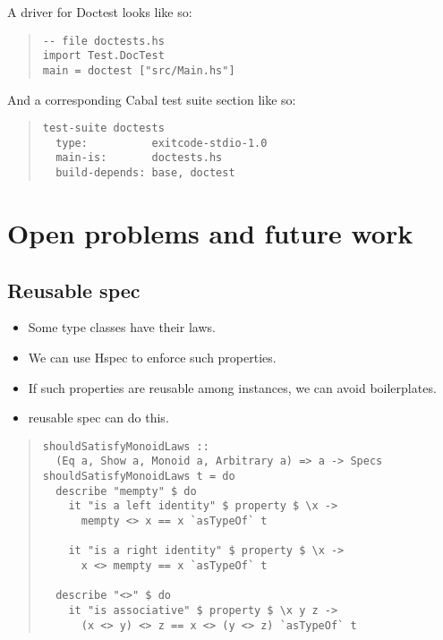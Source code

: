 \documentclass[preprint]{sigplanconf}
\begin{document}
\noindent A driver for Doctest looks like so:

\begin{quote}
\small
\begin{verbatim}
-- file doctests.hs
import Test.DocTest
main = doctest ["src/Main.hs"]
\end{verbatim}
\end{quote}

\noindent And a corresponding Cabal test suite section like so:

\begin{quote}
\small
\begin{verbatim}
test-suite doctests
  type:          exitcode-stdio-1.0
  main-is:       doctests.hs
  build-depends: base, doctest
\end{verbatim}
\end{quote}

\section{Open problems and future work}

\subsection{Reusable spec}

\begin{itemize}
\item Some type classes have their laws.
\item We can use Hspec to enforce such properties.
\item If such properties are reusable among instances,
we can avoid boilerplates.
\item reusable spec can do this.
\end{itemize}

\begin{quote}
\small
\begin{verbatim}
shouldSatisfyMonoidLaws ::
  (Eq a, Show a, Monoid a, Arbitrary a) => a -> Specs
shouldSatisfyMonoidLaws t = do
  describe "mempty" $ do
    it "is a left identity" $ property $ \x ->
      mempty <> x == x `asTypeOf` t

    it "is a right identity" $ property $ \x ->
      x <> mempty == x `asTypeOf` t

  describe "<>" $ do
    it "is associative" $ property $ \x y z ->
      (x <> y) <> z == x <> (y <> z) `asTypeOf` t
\end{verbatim}
\end{quote}
\end{document}
